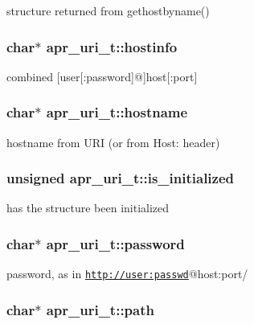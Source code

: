 structure returned from gethostbyname() \hypertarget{structapr__uri__t_a985b18875320d40cdb33d722ecf20ac2}{
\subsubsection[{hostinfo}]{\setlength{\rightskip}{0pt plus 5cm}char$\ast$ apr\-\_\-uri\-\_\-t\-::hostinfo}}\label{structapr__uri__t_a985b18875320d40cdb33d722ecf20ac2}
combined \mbox{[}user\mbox{[}\-:password\mbox{]}@\mbox{]}host\mbox{[}\-:port\mbox{]} \hypertarget{structapr__uri__t_a8c6bf3dfca3d159f091377d9f7228aec}{
\subsubsection[{hostname}]{\setlength{\rightskip}{0pt plus 5cm}char$\ast$ apr\-\_\-uri\-\_\-t\-::hostname}}\label{structapr__uri__t_a8c6bf3dfca3d159f091377d9f7228aec}
hostname from U\-R\-I (or from Host\-: header) \hypertarget{structapr__uri__t_a6f77dda6db6c31c2c3652f6026ea6b73}{
\subsubsection[{is\-\_\-initialized}]{\setlength{\rightskip}{0pt plus 5cm}unsigned apr\-\_\-uri\-\_\-t\-::is\-\_\-initialized}}\label{structapr__uri__t_a6f77dda6db6c31c2c3652f6026ea6b73}
has the structure been initialized \hypertarget{structapr__uri__t_a7eabf4f785f98a12762076f7519d3959}{
\subsubsection[{password}]{\setlength{\rightskip}{0pt plus 5cm}char$\ast$ apr\-\_\-uri\-\_\-t\-::password}}\label{structapr__uri__t_a7eabf4f785f98a12762076f7519d3959}
password, as in \href{http://user:passwd}{\tt http\-://user\-:passwd}@host\-:port/ \hypertarget{structapr__uri__t_a61cff1baadb3c1b52a34b502c25bba7f}{
\subsubsection[{path}]{\setlength{\rightskip}{0pt plus 5cm}char$\ast$ apr\-\_\-uri\-\_\-t\-::path}}\label{structapr__uri__t_a61cff1baadb3c1b52a34b502c25bba7f}

